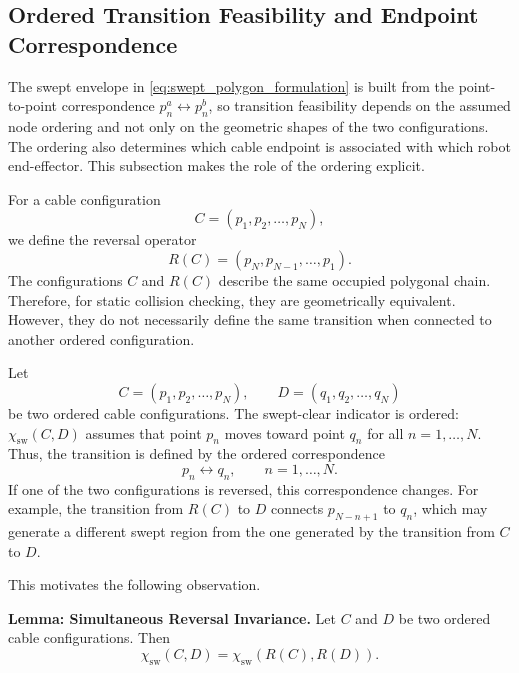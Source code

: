 \documentclass{pas}
\begin{document}
\subsection{Ordered Transition Feasibility and Endpoint Correspondence}
\label{subsec:ordered_transition_feasibility}

The swept envelope in \eqref{eq:swept_polygon_formulation} is built from the
point-to-point correspondence \(p_n^a\leftrightarrow p_n^b\), so transition
feasibility depends on the assumed node ordering and not only on the geometric
shapes of the two configurations. The ordering also determines which cable
endpoint is associated with which robot end-effector. This subsection makes the
role of the ordering explicit.

For a cable configuration
\begin{equation}
C=(p_1,p_2,\ldots,p_N),
\end{equation}
we define the reversal operator
\begin{equation}
R(C)=(p_N,p_{N-1},\ldots,p_1).
\label{eq:reversal_operator}
\end{equation}
The configurations $C$ and $R(C)$ describe the same occupied polygonal chain.
Therefore, for static collision checking, they are geometrically equivalent.
However, they do not necessarily define the same transition when connected to
another ordered configuration.

Let
\begin{equation}
C=(p_1,p_2,\ldots,p_N),
\qquad
D=(q_1,q_2,\ldots,q_N)
\end{equation}
be two ordered cable configurations. The swept-clear indicator is ordered:
\(\chi_{\mathrm{sw}}(C,D)\) assumes that point $p_n$ moves toward point
$q_n$ for all $n=1,\ldots,N$. Thus, the transition is defined by the ordered
correspondence
\begin{equation}
p_n \longleftrightarrow q_n,
\qquad n=1,\ldots,N.
\end{equation}
If one of the two configurations is reversed, this correspondence changes. For
example, the transition from $R(C)$ to $D$ connects $p_{N-n+1}$ to $q_n$,
which may generate a different swept region from the one generated by the
transition from $C$ to $D$.

This motivates the following observation.

\textbf{Lemma: Simultaneous Reversal Invariance.}
Let $C$ and $D$ be two ordered cable configurations. Then
\begin{equation}
\chi_{\mathrm{sw}}(C,D)
=
\chi_{\mathrm{sw}}(R(C),R(D)).
\end{equation}
\end{document}
